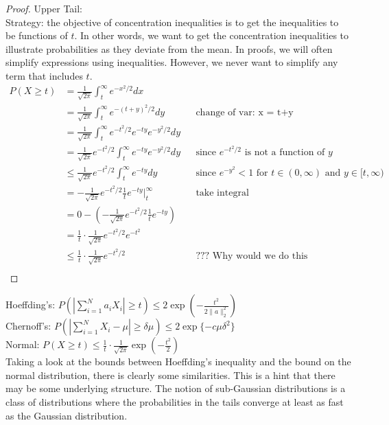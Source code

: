 \begin{proof}
\noindent Upper Tail:  \\ 
Strategy: the objective of concentration inequalities is to get the inequalities to be functions of $t$. In other words, we want to get the concentration inequalities to illustrate probabilities as they deviate from the mean. In proofs, we will often simplify expressions using inequalities. However, we never want to simplify any term that includes $t$.    
    \begin{align*}
    P(X \geq t) &= \frac{1}{\sqrt{2\pi}} \int_{t}^{\infty} e^{-x^2/2}dx &&\text{} \\
    &= \frac{1}{\sqrt{2\pi}} \int_{t}^{\infty} e^{-(t+y)^2/2}dy &&\text{change of var: x = t+y} \\
    &= \frac{1}{\sqrt{2\pi}} \int_{t}^{\infty} e^{-t^2/2} e^{-ty} e^{-y^2/2}dy &&\text{} \\
    &= \frac{1}{\sqrt{2\pi}}e^{-t^2/2} \int_{t}^{\infty} e^{-ty} e^{-y^2/2}dy &&\text{since $e^{-t^2/2}$ is not a function of $y$} \\
    &\leq \frac{1}{\sqrt{2\pi}}e^{-t^2/2} \int_{t}^{\infty} e^{-ty}dy &&\text{since $e^{-y^2} < 1$ for $t \in (0, \infty)$ and $y \in [t,\infty)$} \\
    &= -\frac{1}{\sqrt{2\pi}}e^{-t^2/2} \frac{1}{t}e^{-ty}\Bigg|_{t}^{\infty} &&\text{take integral} \\
    &= 0 - \left( -\frac{1}{\sqrt{2\pi}}e^{-t^2/2} \frac{1}{t}e^{-ty} \right) &&\text{} \\
    &= \frac{1}{t} \cdot \frac{1}{\sqrt{2\pi}}e^{-t^2/2} e^{-t^2} &&\text{} \\
    &\leq \frac{1}{t} \cdot \frac{1}{\sqrt{2\pi}} e^{-t^2/2} &&\text{??? Why would we do this} \\
    \end{align*}
\end{proof}

\noindent 
Hoeffding's: $\displaystyle{P\left(\left|\sum_{i=1}^{N} a_i X_i\right| \geq t\right) \leq 2\exp\left( -\frac{t^2}{2 \|a\|_{2}^{2}}\right)}$ \\ 
Chernoff's: $\displaystyle{P\left(\left|\sum_{i=1}^{N}X_i - \mu\right| \geq \delta \mu\right) \leq 2 \exp{\{-c\mu \delta^2\}}}$ \\ 
Normal: $\displaystyle{ P\left(X \geq t \right) \leq \frac{1}{t}\cdot \frac{1}{\sqrt{2\pi}} \exp{\left(-\frac{t^2}{2}\right)} }$ \\ 

Taking a look at the bounds between Hoeffding's inequality and the bound on the normal distribution, there is clearly some similarities. This is a hint that there may be some underlying structure. The notion of sub-Gaussian distributions is a class of distributions where the probabilities in the tails converge at least as fast as the Gaussian distribution. 

